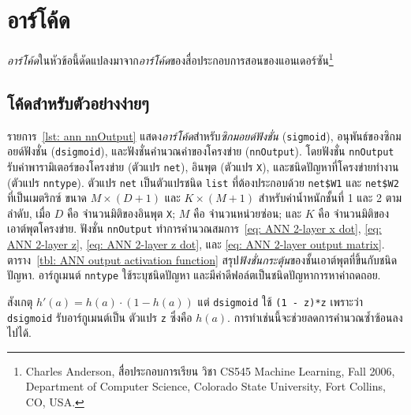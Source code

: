 
\section{อาร์โค้ด}
\label{sec: ann R codes}

\textit{อาร์โค้ด}ในหัวข้อนี้ดัดแปลงมาจาก\textit{อาร์โค้ด}ของสื่อประกอบการสอนของแอนเดอร์ซัน\footnote{Charles Anderson, สื่อประกอบการเรียน วิชา CS545 Machine Learning, Fall 2006, Department of Computer Science, Colorado State University, Fort Collins, CO, USA.}

\subsection{โค้ดสำหรับตัวอย่างง่ายๆ}
\label{sec: ann app code simple example}

รายการ~\ref{lst: ann nnOutput} แสดง\textit{อาร์โค้ด}สำหรับ\textit{ซิกมอยด์ฟังชั่น} (\texttt{sigmoid}), อนุพันธ์ของซิกมอยด์ฟังชั่น (\texttt{dsigmoid}), และฟังชั่นคำนวณค่าของโครงข่าย (\texttt{nnOutput}).
โดยฟังชั่น \texttt{nnOutput} รับค่าพารามิเตอร์ของโครงข่าย (ตัวแปร \texttt{net}), 
อินพุต (ตัวแปร \texttt{X}), 
และชนิดปัญหาที่โครงข่ายทำงาน (ตัวแปร \texttt{nntype}).
ตัวแปร \texttt{net} เป็นตัวแปรชนิด \texttt{list} ที่ต้องประกอบด้วย \texttt{net\$W1} และ \texttt{net\$W2} ที่เป็นเมตริกซ์ ขนาด $M \times (D+1)$ และ $K \times (M+1)$ สำหรับค่าน้ำหนักชั้นที่ 1 และ 2 ตามลำดับ,
เมื่อ $D$ คือ จำนวนมิติของอินพุต \texttt{X};
 $M$ คือ จำนวนหน่วยซ่อน;
 และ $K$ คือ จำนวนมิติของเอาต์พุตโครงข่าย.
ฟังชั่น \texttt{nnOutput} ทำการคำนวณสมการ~\ref{eq: ANN 2-layer x dot}, \ref{eq: ANN 2-layer z}, \ref{eq: ANN 2-layer z dot}, และ \ref{eq: ANN 2-layer output matrix}.
ตาราง~\ref{tbl: ANN output activation function} สรุป\textit{ฟังชั่นกระตุ้น}ของชั้นเอาต์พุตที่ขึ้นกับชนิดปัญหา.
อาร์กูเมนต์ \texttt{nntype} ใช้ระบุชนิดปัญหา และมีค่าดีฟอล์ตเป็นชนิดปัญหาการหาค่าถดถอย.



สังเกตุ $h'(a) = h(a) \cdot (1 - h(a))$ 
แต่ \texttt{dsigmoid} ใช้ \texttt{(1 - z)*z} 
เพราะว่า \texttt{dsigmoid} รับอาร์กูเมนต์เป็น ตัวแปร \texttt{z} ซึ่งคือ $h(a)$.
การทำเช่นนี้จะช่วยลดการคำนวณซ้ำซ้อนลงไปได้.

